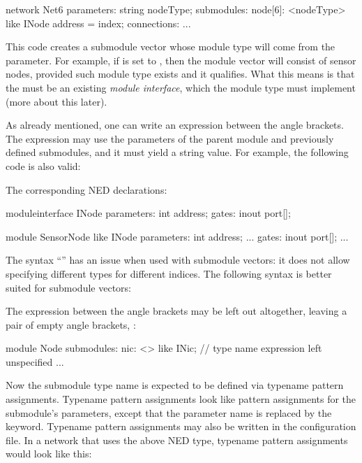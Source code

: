 \begin{ned}
network Net6
{
    parameters:
        string nodeType;
    submodules:
        node[6]: <nodeType> like INode {
            address = index;
        }
    connections:
        ...
}
\end{ned}

This code creates a submodule vector whose module type will come from the
 parameter. For example, if  is set to ,
then the module vector will consist of sensor nodes, provided such module
type exists and it qualifies. What this means is that the  must be
an existing \textit{module interface}, which the 
module type must implement (more about this later).

As already mentioned, one can write an expression between the angle brackets.
The expression may use the parameters of the parent module and previously
defined submodules, and it must yield a string value. For example, the following
code is also valid:

\begin{ned}
network Net6
{
    parameters:
        string nodeTypePrefix;
        int variant;
    submodules:
        node[6]: <nodeTypePrefix + "Node" + string(variant)> like INode {
           ...
}
\end{ned}

The corresponding NED declarations:

\begin{ned}
moduleinterface INode
{
    parameters:
        int address;
    gates:
        inout port[];
}

module SensorNode like INode
{
    parameters:
        int address;
        ...
    gates:
        inout port[];
        ...
}
\end{ned}

The syntax ``'' has an issue when used with submodule
vectors: it does not allow specifying different types for different indices. The
following syntax is better suited for submodule vectors:

The expression between the angle brackets may be left out altogether, leaving a
pair of empty angle brackets, \ttt{<>}:

\begin{ned}
module Node
{
    submodules:
        nic: <> like INic;  // type name expression left unspecified
        ...
}
\end{ned}

Now the submodule type name is expected to be defined via typename pattern
assignments. Typename pattern assignments look like pattern assignments for the
submodule's parameters, except that the parameter name is replaced by the
 keyword. Typename pattern assignments may also be written in
the configuration file. In a network that uses the above  NED type,
typename pattern assignments would look like this:

